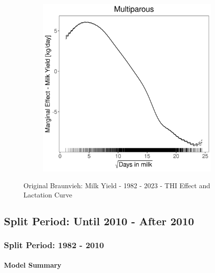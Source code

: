 \begin{figure}[H]
\begin{subfigure}[b]{0.45\textwidth}
    \end{subfigure}
    \hspace{0.05\textwidth} %
    \begin{subfigure}[b]{0.45\textwidth}
        \centering
        \includegraphics[width=\textwidth]{thesis/figures/models/milk/full/ob_milk_full/ob_milk_full_marginal_dim_milk_multi.png}
    \end{subfigure}
    \caption[]{Original Braunvieh: Milk Yield - 1982 - 2023 - THI Effect and Lactation Curve}
    \label{fig:main}
\end{figure}

\subsection{Split Period: Until 2010 - After 2010}
\subsubsection{Split Period: 1982 - 2010}\label{model:ob_milk_before}
\paragraph{Model Summary} \quad \\


